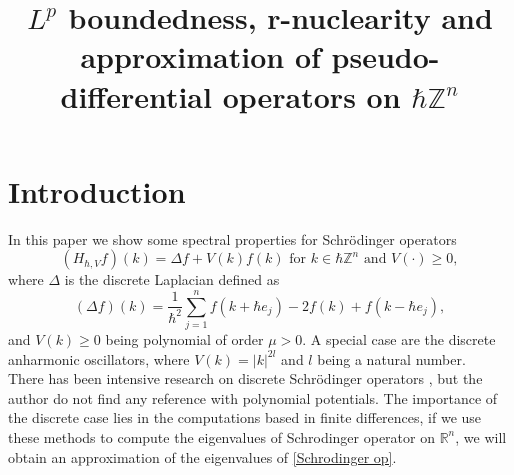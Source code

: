 \documentclass[pdflatex,sn-mathphys-num]{sn-jnl}%
\theoremstyle{thmstyleone}%
\theoremstyle{thmstyletwo}%
\theoremstyle{thmstylethree}%
\begin{document}
\title[Article Title]{$L^p$ boundedness, r-nuclearity and approximation of pseudo-differential operators on $\hbar\mathbb{Z}^n$}


\author*[1]{ }









\maketitle

\section{Introduction}\label{sec1}
In this paper we show some spectral properties for Schrödinger operators 
\begin{equation}\label{Schrodinger op}
(H_{\hbar,V}f)(k)=\Delta f+ V(k)f(k) \text{  for } k\in\hbar\mathbb{Z}^n \text{ and } V(\cdot)\geq0,
\end{equation}
where $\Delta$ is the discrete Laplacian defined as 
\[ (\Delta f)(k)=\frac{1}{\hbar^2}\sum_{j=1}^{n}f(k+\hbar e_j)-2f(k)+f(k-\hbar e_j),   \]
and $V(k)\geq 0$ being polynomial of order $\mu>0$. A special case are the discrete anharmonic oscillators, where $V(k)=|k|^{2l}$ and $l$ being a natural number.\\
\indent There has been intensive research on discrete Schrödinger operators \cite{rabinovich2008essential,rabinovich2004pseudodifference,rabinovich2010exponential,barrera2019numerical,albeverio2004schrodinger}, but the author do not find any reference with polynomial potentials. The importance of the discrete case lies in the computations based in finite differences, if we use these methods to compute the eigenvalues of Schrodinger operator on $\mathbb{R}^n$, we will obtain an approximation of the eigenvalues of \eqref{Schrodinger op}.\\ 
\end{document}
